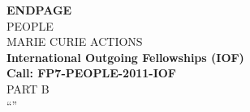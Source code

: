  \begin{center}
  \vspace{6ex}
  \vspace{6ex}
  \LARGE{\textbf{ENDPAGE}} \\
  \vspace{6ex}
  PEOPLE \\
  MARIE CURIE ACTIONS \\
  \vspace{6ex}
  \textbf{International Outgoing Fellowships (IOF) \\
  Call: FP7-PEOPLE-2011-IOF}\\
  \vspace{6ex}
  PART B \\
  \vspace{6ex}
  ``\ksem''
\end{center}